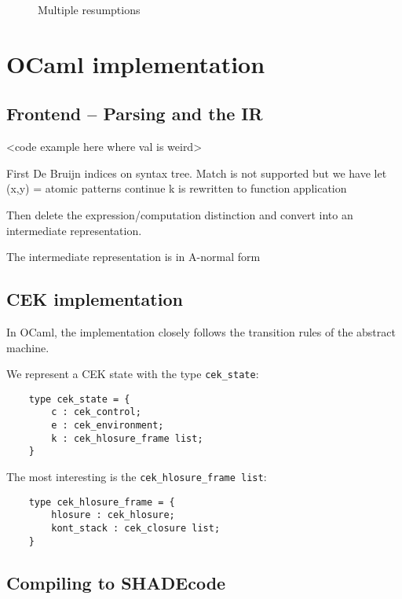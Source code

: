 \documentclass[class=article, crop=false]{standalone}
\begin{document}
\begin{landscape}
    \begin{figure}
        \centering
        \caption{Multiple resumptions}
        \label{fig:shadecode-two-resume}
    \end{figure}
\end{landscape}


\section{OCaml implementation}

\subsection{Frontend -- Parsing and the IR}

<code example here where val is weird>

First De Bruijn indices on syntax tree.
Match is not supported but we have let (x,y) =
atomic patterns
continue k is rewritten to function application

Then delete the expression/computation distinction and convert into
an intermediate representation.

The intermediate representation is in A-normal form 

\subsection{CEK implementation}

In OCaml, the implementation closely follows the transition rules of the abstract machine.

We represent a CEK state with the type \verb|cek_state|:
\begin{verbatim}
    type cek_state = {
        c : cek_control;
        e : cek_environment;
        k : cek_hlosure_frame list;
    }
\end{verbatim}

The most interesting is the \verb|cek_hlosure_frame list|:
\begin{verbatim}
    type cek_hlosure_frame = {
        hlosure : cek_hlosure;
        kont_stack : cek_closure list;
    }
\end{verbatim}

\subsection{Compiling to SHADEcode}
\end{document}
